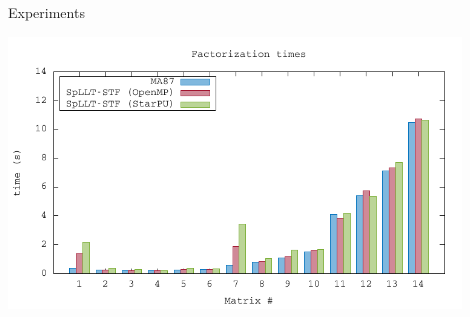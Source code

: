\documentclass[unknownkeysallowed]{beamer}
\begin{document}
\begin{frame}{Experiments}
  
  
  \begin{center}
    \includegraphics[width=0.9\textwidth]{data/cmp_facto_stf}


\end{center}
\end{frame}
\end{document}
